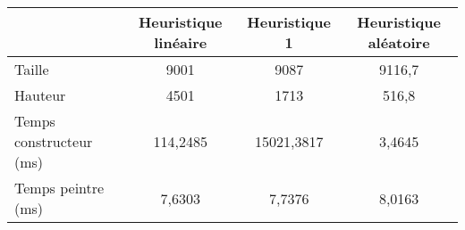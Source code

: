 \begin{center}
{\tabulinesep=1.2mm
\begin{tabu}{|l|c|c|c|}
  \hline
  & Heuristique linéaire  & Heuristique 1 & Heuristique aléatoire \\ 
  \hline
  Taille &      9001&      9087&    9116,7  \\ 
  \hline
  Hauteur &      4501&      1713&     516,8  \\ 
  \hline
  Temps constructeur (ms) &        114,2485&      15021,3817&          3,4645  \\ 
  \hline
  Temps peintre (ms) &            7,6303&           7,7376&           8,0163  \\ 
  \hline
\end{tabu}
}
\end{center}

